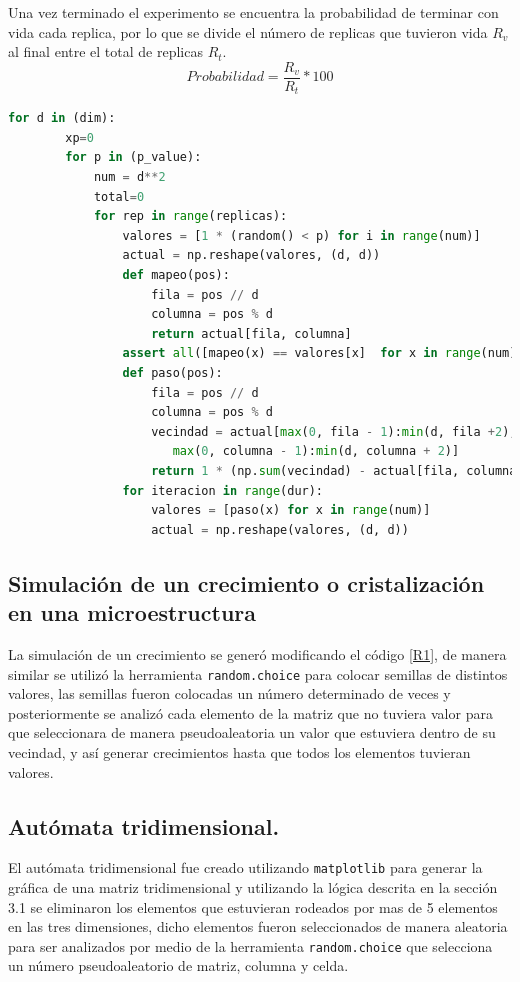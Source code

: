 \documentclass{article}
\begin{document}
Una vez terminado el experimento se encuentra la probabilidad de terminar con vida cada replica, por lo que se divide el número de replicas que tuvieron vida $R_v$al final entre el total de replicas $R_t$.
\begin{equation}
    Probabilidad=\frac{R_v}{R_t}*100
\end{equation}
\lstset{basicstyle=\ttfamily, keywordstyle=\bfseries}
\begin{lstlisting}[frame=single,language=Python,caption=Programación de un autómata celular variando el valor de $p$ y $num$\label{R1}]
  for d in (dim):
        xp=0
        for p in (p_value):
            num = d**2
            total=0
            for rep in range(replicas):
                valores = [1 * (random() < p) for i in range(num)]
                actual = np.reshape(valores, (d, d))
                def mapeo(pos):  
                    fila = pos // d
                    columna = pos % d
                    return actual[fila, columna]
                assert all([mapeo(x) == valores[x]  for x in range(num)])
                def paso(pos):
                    fila = pos // d
                    columna = pos % d
                    vecindad = actual[max(0, fila - 1):min(d, fila +2),
                       max(0, columna - 1):min(d, columna + 2)]
                    return 1 * (np.sum(vecindad) - actual[fila, columna] == 3)
                for iteracion in range(dur):
                    valores = [paso(x) for x in range(num)]
                    actual = np.reshape(valores, (d, d))
\end{lstlisting}  
\subsection{Simulación de un crecimiento o cristalización en una microestructura}
La simulación de un crecimiento se generó modificando el código \ref{R1}, de manera similar se utilizó la herramienta \texttt{random.choice} para colocar semillas de distintos valores, las semillas fueron colocadas un número determinado de veces y posteriormente se analizó cada elemento de la matriz que no tuviera valor para que seleccionara de manera pseudoaleatoria un valor que estuviera dentro de su vecindad, y así generar crecimientos hasta que todos los elementos tuvieran valores.
\subsection{Autómata tridimensional.}
El autómata tridimensional fue creado utilizando \texttt{matplotlib} para generar la gráfica de una matriz tridimensional y utilizando la lógica descrita en la sección 3.1 se eliminaron los elementos que estuvieran rodeados por mas de 5 elementos en las tres dimensiones, dicho elementos fueron seleccionados de manera aleatoria para ser analizados por medio de la herramienta \texttt{random.choice} que selecciona un número pseudoaleatorio de matriz, columna y celda.
\end{document}
